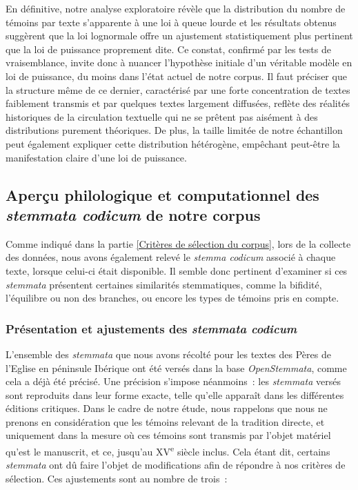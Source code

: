 \documentclass[a4paper,twoside,12pt]{book}
\begin{document}

En définitive, notre analyse exploratoire révèle que la distribution du nombre de témoins par texte s’apparente à une loi à queue lourde et les résultats obtenus suggèrent que la loi lognormale offre un ajustement statistiquement plus pertinent que la loi de puissance proprement dite. Ce constat, confirmé par les tests de vraisemblance, invite donc à nuancer l’hypothèse initiale d’un véritable modèle en loi de puissance, du moins dans l’état actuel de notre corpus. Il faut préciser que la structure même de ce dernier, caractérisé par une forte concentration de textes faiblement transmis et par quelques textes largement diffusées, reflète des réalités historiques de la circulation textuelle qui ne se prêtent pas aisément à des distributions purement théoriques. De plus, la taille limitée de notre échantillon peut également expliquer cette distribution hétérogène, empêchant peut-être la manifestation claire d’une loi de puissance. 

\subsection{Aperçu philologique et computationnel des \textit{stemmata codicum} de notre corpus}
\label{stemmata}

Comme indiqué dans la partie \ref{Critères de sélection du corpus}, lors de la collecte des données, nous avons également relevé le \textit{stemma codicum} associé à chaque texte, lorsque celui-ci était disponible. Il semble donc pertinent d’examiner si ces \textit{stemmata} présentent certaines similarités stemmatiques, comme la bifidité, l’équilibre ou non des branches, ou encore les types de témoins pris en compte.

\subsubsection{Présentation et ajustements des \textit{stemmata codicum}}
	
L'ensemble des \textit{stemmata} que nous avons récolté pour les textes des Pères de l'Eglise en péninsule Ibérique ont été versés dans la base \textit{OpenStemmata}, comme cela a déjà été précisé. Une précision s’impose néanmoins~: les \textit{stemmata} versés sont reproduits dans leur forme exacte, telle qu’elle apparaît dans les différentes éditions critiques. Dans le cadre de notre étude, nous rappelons que nous ne prenons en considération que les témoins relevant de la tradition directe, et uniquement dans la mesure où ces témoins sont transmis par l’objet matériel qu’est le manuscrit, et ce, jusqu’au XV\textsuperscript{e} siècle inclus.
Cela étant dit, certains \textit{stemmata} ont dû faire l’objet de modifications afin de répondre à nos critères de sélection. Ces ajustements sont au nombre de trois~:
	
\end{document}
